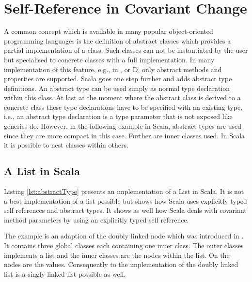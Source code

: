 \section{Self-Reference in Covariant Change}
A common concept which is available in many popular object-oriented
programming languages is the definition of abstract classes which
provides a partial implementation of a class. Such classes can not be
instantiated by the user but specialised to concrete classes with a full
implementation. In many implementation of this feature, e.g., in \cpp,
\cs or D, only abstract methods and properties are supported. Scala goes
one step further and adds abstract type definitions. An abstract type can
be used simply as normal type declaration within this class. At last at
the moment where the abstract class is derived to a concrete class these
type declarations have to be specified with an existing type, i.e.,
an abstract type declaration is a type parameter that is not exposed
like generics do. However, in the following example in Scala, abstract
types are used since they are more compact in this case. Further are
inner classes used. In Scala it is possible to nest classes within others.

\subsection{A List in Scala}
Listing \ref{lst:abstractType} presents an implementation of a List
in Scala. It is not a best implementation of a list possible but shows
how Scala uses explicitly typed self references and abstract types. It
shows as well how Scala deals with covariant method parameters by using
an explicitly typed self reference.

The example is an adaption of the doubly linked node which was introduced
in . It contains three global classes each
containing one inner class. The outer classes implements a list and
the inner classes are the nodes within the list. On the nodes are the
values. Consequently to the implementation of the doubly linked list is
a singly linked list possible as well.

